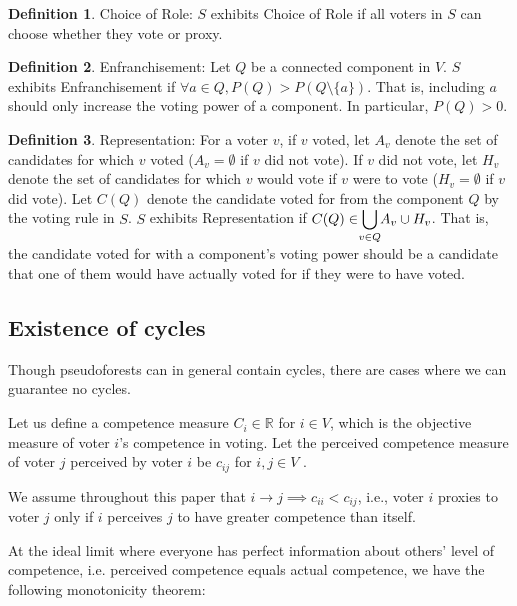 \documentclass[10pt]{article}
\theoremstyle{definition}
\newtheorem{definition}{Definition}[section]
\begin{document}
\theoremstyle{definition}
\begin{definition}{Choice of Role:}
$S$ exhibits Choice of Role if all voters in $S$ can choose whether they vote or proxy.
\end{definition}

\theoremstyle{definition}
\begin{definition}{Enfranchisement:}
Let $Q$ be a connected component in $V$. $S$ exhibits Enfranchisement if $\forall a \in Q, P(Q) > P(Q\setminus\{a\})$. That is, including $a$ should only increase the voting power of a component. In particular, $P(Q) > 0$.
\end{definition}

\theoremstyle{definition}
\begin{definition}{Representation:}
For a voter $v$, if $v$ voted, let $A_v$ denote the set of candidates for which $v$ voted ($A_v = \emptyset$ if $v$ did not vote). If $v$ did not vote, let $H_v$ denote the set of candidates for which $v$ would vote if $v$ were to vote ($H_v = \emptyset$ if $v$ did vote). Let $C(Q)$ denote the candidate voted for from the component $Q$ by the voting rule in $S$. $S$ exhibits Representation if $C(Q) \in \smashoperator{\bigcup\limits_{v \in Q}}A_v\cup H_v$. That is, the candidate voted for with a component's voting power should be a candidate that one of them would have actually voted for if they were to have voted.
\end{definition}


\subsection{Existence of cycles}

Though pseudoforests can in general contain cycles, there are cases where we can guarantee no cycles.

Let us define a competence measure $C_i \in \mathbb{R}$ for $ i \in V$, which is the objective measure of voter $i$'s competence in voting. Let the perceived competence measure of voter $j$ perceived by voter $i$ be $c_{ij}$ for $i, j \in V$ . 

We assume throughout this paper that $i \rightarrow j \implies c_{ii} < c_{ij}$, i.e., voter $i$ proxies to voter $j$ only if $i$ perceives $j$ to have greater competence than itself.


At the ideal limit where everyone has perfect information about others' level of competence, i.e. perceived competence equals actual competence, we have the following monotonicity theorem:
\end{document}
